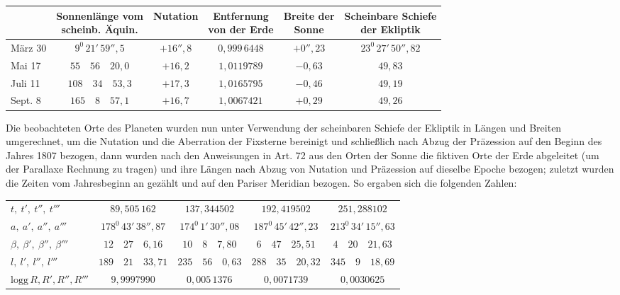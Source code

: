 \begin{center}
\begingroup\fontsize{9}{11}\selectfont\setlength{\tabcolsep}{2pt}
\begin{tabular}{|l|c|c|c|c|c|}
\hline
& \shortstack{Sonnenlänge vom\\scheinb. Äquin.} & Nutation & \shortstack{Entfernung\\von der Erde} & \shortstack{Breite der\\Sonne} & \shortstack{Scheinbare Schiefe\\der Ekliptik}\\\hline
März 30 & $9^0\,21'\,59''{,}5$ & $+16''{,}8$ & $0{,}999\,6448$ & $+0''{,}23$ & $23^0\,27'\,50''{,}82$\\
Mai 17 & $55\quad56\quad20{,}0$ & $+16{,}2$ & $1{,}0119789$ & $-0{,}63$ & $49{,}83$\\
Juli 11 & $108\quad34\quad53{,}3$ & $+17{,}3$ & $1{,}0165795$ & $-0{,}46$ & $49{,}19$\\
Sept. 8 & $165\quad8\quad57{,}1$ & $+16{,}7$ & $1{,}0067421$ & $+0{,}29$ & $49{,}26$\\\hline
\end{tabular}\endgroup
\end{center}

Die beobachteten Orte des Planeten wurden nun unter Verwendung der scheinbaren Schiefe der Ekliptik in Längen und Breiten umgerechnet, um die Nutation und die Aberration der Fixsterne bereinigt und schließlich nach Abzug der Präzession auf den Beginn des Jahres 1807 bezogen, dann wurden nach den Anweisungen in Art. 72 aus den Orten der Sonne die fiktiven Orte der Erde abgeleitet (um der Parallaxe Rechnung zu tragen) und ihre Längen nach Abzug von Nutation und Präzession auf dieselbe Epoche bezogen; zuletzt wurden die Zeiten vom Jahresbeginn an gezählt und auf den Pariser Meridian bezogen. So ergaben sich die folgenden Zahlen:
\begin{center}
\begingroup\fontsize{9}{11}\selectfont\setlength{\tabcolsep}{2.5pt}
\begin{tabular}{l|c|c|c|c}
$t,\ t',\ t'',\ t'''$ & $89{,}505\,162$ & $137{,}344502$ & $192{,}419502$ & $251{,}288102$\\
$a,\ a',\ a'',\ a'''$ & $178^0\,43'\,38''{,}87$ & $174^0\,1'\,30''{,}08$ & $187^0\,45'\,42''{,}23$ & $213^0\,34'\,15''{,}63$\\
$\beta,\ \beta',\ \beta'',\ \beta'''$ & $12\quad27\quad6{,}16$ & $10\quad8\quad7{,}80$ & $6\quad47\quad25{,}51$ & $4\quad20\quad21{,}63$\\
$l,\ l',\ l'',\ l'''$ & $189\quad21\quad33{,}71$ & $235\quad56\quad0{,}63$ & $288\quad35\quad20{,}32$ & $345\quad9\quad18{,}69$\\
$\mathrm{logg}\,R,R',R'',R'''$ & $9{,}9997990$ & $0{,}005\,1376$ & $0{,}0071739$ & $0{,}0030625$
\end{tabular}\endgroup
\end{center}

